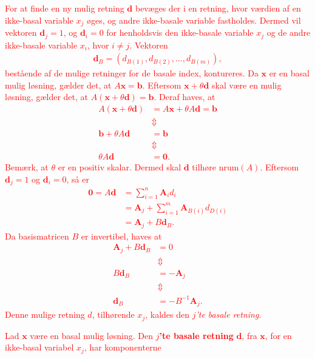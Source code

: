 \textcolor{red}{
For at finde en ny mulig retning $\mathbf{d}$ bevæges der i en retning, hvor værdien af en ikke-basal variable $x_j$ øges, og andre ikke-basale variable fastholdes. 
Dermed vil vektoren $\mathbf{d}_j = 1$, og $\mathbf{d}_i = 0$ for henholdsvis den ikke-basale variable $x_j$ og de andre ikke-basale variable $x_i$, hvor $i \neq j$.
Vektoren 
\begin{align*}
\mathbf{d}_B = \left( d_{B(1)}, d_{B(2)}, \ldots , d_{B(m)} \right),
\end{align*} 
bestående af de mulige retninger for de basale index, 
kontureres.
Da $\mathbf{x}$ er en basal mulig løsning, gælder det, at $A \mathbf{x} = \mathbf{b}$. 
Eftersom $\mathbf{x}+ \theta \mathbf{d}$ skal være en mulig løsning, gælder det, at $A ( \mathbf{x}+ \theta \mathbf{d}) = \mathbf{b}$.
Deraf haves, at 
\begin{align*}
A ( \mathbf{x}+ \theta \mathbf{d}) &=  A \mathbf{x} + \theta A \mathbf{d} = \mathbf{b} \\
& \Updownarrow \\
\mathbf{b} + \theta A \mathbf{d} & = \mathbf{b} \\
& \Updownarrow \\
\theta A \mathbf{d} & = \mathbf{0}.
\end{align*} 
Bemærk, at $\theta$ er en positiv skalar. 
Dermed skal $\mathbf{d}$ tilhøre $\text{nrum}(A)$.
Eftersom $\mathbf{d}_j = 1$ og $\mathbf{d}_i = 0$, så er 
%
\begin{align*}
\mathbf{0} = A \mathbf{d} & = \sum^n_{i = 1} \mathbf{A}_i d_i \\
& =  \mathbf{A}_j  + \sum^m_{i = 1} \mathbf{A}_{B(i)} d_{D(i)} \\
& =  \mathbf{A}_j  + B \mathbf{d}_B.
\end{align*}
%
Da basismatricen $B$ er invertibel, haves at
% 
\begin{align*}
\mathbf{A}_j  + B \mathbf{d}_B & = 0 \\
& \Updownarrow \\
B \mathbf{d}_B & = - \mathbf{A}_j \\
& \Updownarrow \\
\mathbf{d}_B & = - B^{-1} \mathbf{A}_j .
\end{align*}
% 
Denne mulige retning $d$, tilhørende $x_j$, kaldes den \textit{$j$'te basale retning}.
% 
\begin{defn}{}{}
Lad $\mathbf{x}$ være en basal mulig løsning. 
Den \textbf{$j$'te basale retning} $\mathbf{d}$, fra $\mathbf{x}$, for en ikke-basal variabel $x_j$, har komponenterne 

\end{defn}}
